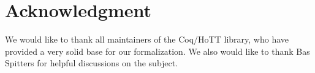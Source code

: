 \documentclass[conference]{IEEEtran}
\begin{document}


\section*{Acknowledgment}

We would like to thank all maintainers of the Coq/HoTT library, who
have provided a very solid base for our formalization. We also would like
to thank Bas Spitters for helpful discussions on the subject.





%
%


\end{document}
